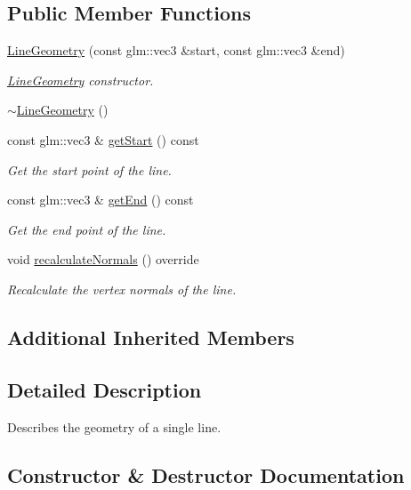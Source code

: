 \subsection*{Public Member Functions}
\begin{DoxyCompactItemize}
\item 
\mbox{\hyperlink{classec_1_1_line_geometry_a4b81b2c570058683d7af913882ed3dfb}{Line\+Geometry}} (const glm\+::vec3 \&start, const glm\+::vec3 \&end)
\begin{DoxyCompactList}\small\item\em \mbox{\hyperlink{classec_1_1_line_geometry}{Line\+Geometry}} constructor. \end{DoxyCompactList}\item 
\mbox{\hyperlink{classec_1_1_line_geometry_af91430db7913243304adba2dd398e5b4}{$\sim$\+Line\+Geometry}} ()
\item 
const glm\+::vec3 \& \mbox{\hyperlink{classec_1_1_line_geometry_a68975a8bddebc31db08839ec6064a864}{get\+Start}} () const
\begin{DoxyCompactList}\small\item\em Get the start point of the line. \end{DoxyCompactList}\item 
const glm\+::vec3 \& \mbox{\hyperlink{classec_1_1_line_geometry_a3f4616c581e43529651008c594c4c8f7}{get\+End}} () const
\begin{DoxyCompactList}\small\item\em Get the end point of the line. \end{DoxyCompactList}\item 
void \mbox{\hyperlink{classec_1_1_line_geometry_a7a0b22930aa566c97d5f86f2a8246696}{recalculate\+Normals}} () override
\begin{DoxyCompactList}\small\item\em Recalculate the vertex normals of the line. \end{DoxyCompactList}\end{DoxyCompactItemize}
\subsection*{Additional Inherited Members}


\subsection{Detailed Description}
Describes the geometry of a single line. 

\subsection{Constructor \& Destructor Documentation}
\mbox{\label{classec_1_1_line_geometry_a4b81b2c570058683d7af913882ed3dfb}} 
